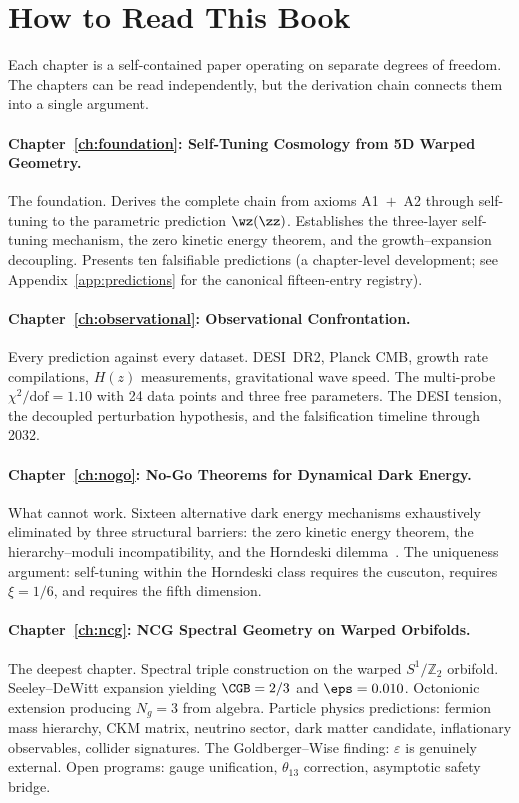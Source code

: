 \section{How to Read This Book}
\label{sec:0-reading}

Each chapter is a self-contained paper operating on separate degrees
of freedom. The chapters can be read independently, but the derivation
chain connects them into a single argument.

\paragraph{Chapter~\ref{ch:foundation}: Self-Tuning Cosmology from 5D
Warped Geometry.}
The foundation. Derives the complete chain from axioms A1~$+$~A2
through self-tuning to the parametric prediction $\wz(\zz)$.
Establishes the three-layer self-tuning mechanism, the zero kinetic
energy theorem, and the growth--expansion decoupling. Presents ten
falsifiable predictions (a chapter-level development; see
Appendix~\ref{app:predictions} for the canonical fifteen-entry registry).

\paragraph{Chapter~\ref{ch:observational}: Observational Confrontation.}
Every prediction against every dataset. DESI~DR2, Planck CMB, growth
rate compilations, $H(z)$ measurements, gravitational wave speed. The
multi-probe $\chi^2/\mathrm{dof} = 1.10$ with 24 data points and three
free parameters. The DESI tension, the decoupled perturbation
hypothesis, and the falsification timeline through 2032.

\paragraph{Chapter~\ref{ch:nogo}: No-Go Theorems for Dynamical Dark
Energy.}
What cannot work. Sixteen alternative dark energy mechanisms
exhaustively eliminated by three structural barriers: the zero kinetic
energy theorem, the hierarchy--moduli incompatibility, and the
Horndeski dilemma~\cite{ch1:horndeski74}. The uniqueness argument:
self-tuning within the Horndeski class requires the cuscuton, requires
$\xi = 1/6$, and requires the fifth dimension.

\paragraph{Chapter~\ref{ch:ncg}: NCG Spectral Geometry on Warped
Orbifolds.}
The deepest chapter. Spectral triple construction on the warped
$S^1/\mathbb{Z}_2$ orbifold. Seeley--DeWitt expansion yielding
$\CGB = 2/3$ and $\eps = 0.010$. Octonionic extension producing
$N_g = 3$ from algebra. Particle physics predictions: fermion mass
hierarchy, CKM matrix, neutrino sector, dark matter candidate,
inflationary observables, collider signatures. The Goldberger--Wise
finding: $\varepsilon$ is genuinely external. Open programs: gauge
unification, $\theta_{13}$ correction, asymptotic safety bridge.

